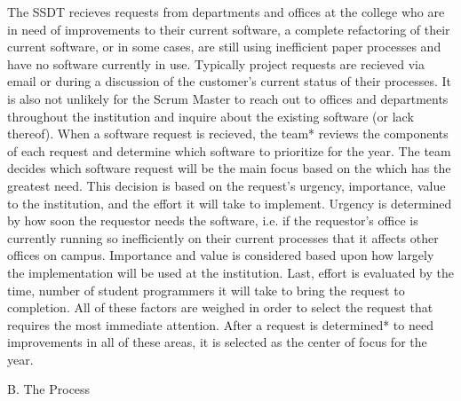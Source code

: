 The SSDT recieves requests from departments and offices at the college who are in need of improvements to their current software, a complete refactoring of their current software, or in some cases, are still using inefficient paper processes and have no software currently in use. Typically project requests are recieved via email or during a discussion of the customer's current status of their processes. It is also not unlikely for the Scrum Master to reach out to offices and departments throughout the institution and inquire about the existing software (or lack thereof).  When a software request is recieved, the team* reviews the components of each request and determine which software to prioritize for the year. The team decides which software request will be the main focus based on the which has the greatest need. This decision is based on the request's urgency, importance, value to the institution, and the effort it will take to implement. Urgency is determined by how soon the requestor needs the software, i.e. if the requestor's office is currently running so inefficiently on their current processes that it affects other offices on campus. Importance and value is considered based upon how largely the implementation will be used at the institution. Last, effort is evaluated by the time, number of student programmers it will take to bring the request to completion. All of these factors are weighed in order to select the request that requires the most immediate attention. After a request is determined* to need improvements in all of these areas, it is selected as the center of focus for the year.

B. The Process


